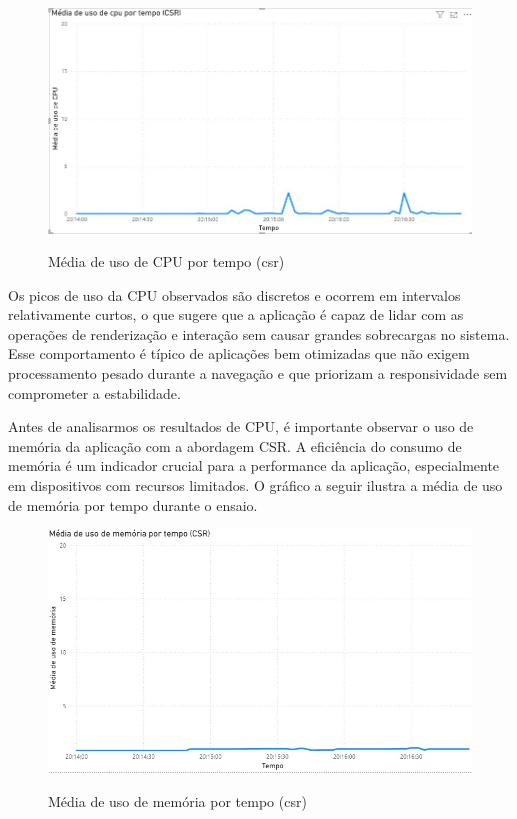 {\begin{figure}[h]
\centering
\caption{Média de uso de CPU por tempo (\acrshort{csr})}
\includegraphics[width=1.0\textwidth]{media/uso_cpu_csr.jpeg}
\label{fig:csr-cpu}
\end{figure}


Os picos de uso da CPU observados são discretos e ocorrem em intervalos relativamente curtos, o que sugere que a aplicação é capaz de lidar com as operações de renderização e interação sem causar grandes sobrecargas no sistema. Esse comportamento é típico de aplicações bem otimizadas que não exigem processamento pesado durante a navegação e que priorizam a responsividade sem comprometer a estabilidade.

Antes de analisarmos os resultados de CPU, é importante observar o uso de memória da aplicação com a abordagem CSR. A eficiência do consumo de memória é um indicador crucial para a performance da aplicação, especialmente em dispositivos com recursos limitados. O gráfico a seguir ilustra a média de uso de memória por tempo durante o ensaio.


\begin{figure}[h]
\centering
\caption{Média de uso de memória por tempo (\acrshort{csr})}
\includegraphics[width=1.0\textwidth]{media/uso_memoria_csr.jpeg}
\label{fig:csr-mem}
\end{figure}

}
